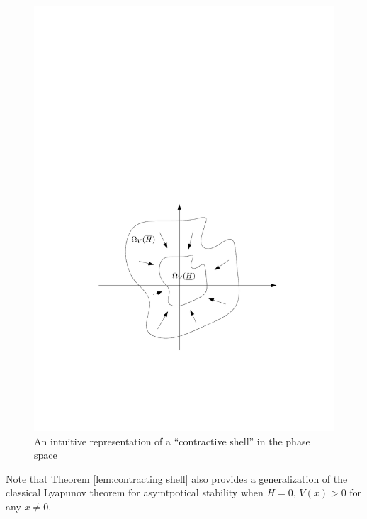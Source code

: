 \documentclass[letterpaper,10pt,twocolumn,journal,final]{IEEEtran}
\begin{document}
\begin{figure}
	\centering
	\includegraphics[width=0.9\columnwidth]{ContainedLyap}
	\caption{An intuitive representation of a ``contractive shell'' in the phase space
	\label{fig:contained lyap}}
\end{figure}
Note that Theorem \ref{lem:contracting shell} also provides a generalization of the 
classical Lyapunov theorem for asymtpotical stability when $\underline{H}=0$, $V(x)>0$ for any $x\neq 0$.
\end{document}
